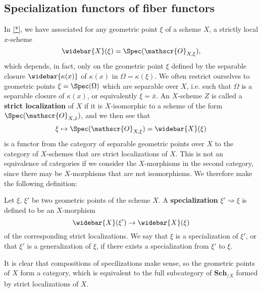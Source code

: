 \subsection{Specialization functors of fiber functors}
In \autoref{*}, we have associated for any geometric point $\xi$ of a scheme $X$, a strictly local $x$-scheme
\[\widebar{X}(\xi)=\Spec(\mathscr{O}_{X,\xi}),\]
which depends, in fact, only on the geometric point $\xi$ defined by the separable closure $\widebar{\kappa(x)}$ of $\kappa(x)$ in $\Omega=\kappa(\xi)$. We often restrict ourselves to geometric points $\xi=\Spec(\Omega)$ which are separable over $X$, i.e. such that $\Omega$ is a separable closure of $\kappa(x)$, or equivalently $\xi=\bar{x}$. An $X$-scheme $Z$ is called a \textbf{strict localization} of $X$ if it is $X$-isomorphic to a scheme of the form $\Spec(\mathscr{O}_{X,\bar{x}})$, and we then see that
\[\xi\mapsto\Spec(\mathscr{O}_{X,\xi})=\widebar{X}(\xi)\]
is a functor from the category of separable geometric points over $X$ to the category of $X$-schemes that are strict localizations of $X$. This is not an equivalence of categories if we consider the $X$-morphisms in the second category, since there may be $X$-morphisms that are not isomorphisms. We therefore make the following definition:
\begin{definition}
Let $\xi$, $\xi'$ be two geometric points of the scheme $X$. A \textbf{specialization} $\xi'\rightsquigarrow\xi$ is defined to be an $X$-morphism 
\[\widebar{X}(\xi')\to\widebar{X}(\xi)\]
of the corresponding strict localizations. We say that $\xi$ is a specialization of $\xi'$, or that $\xi'$ is a generalization of $\xi$, if there exists a specialization from $\xi'$ to $\xi$.
\end{definition}
It is clear that compositions of specilizations make sense, so the geometric points of $X$ form a category, which is equivalent to the full subcategory of $\mathbf{Sch}_{/X}$ formed by strict localizations of $X$.

